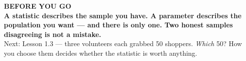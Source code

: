 \documentclass[aspectratio=169, 11pt]{beamer}
\begin{document}
{
\begin{frame}[plain]
  \vspace{1.5cm}\hspace{0.8cm}%
  \begin{minipage}{0.86\textwidth}
    {\color{goldacc}\bfseries\small BEFORE YOU GO}\\[0.7cm]
    {\color{white}\bfseries\Large A statistic describes the sample you have. A parameter
    describes the population you want --- and there is only one. Two honest samples
    disagreeing is not a mistake.}\\[0.9cm]
    {\color{frostmid}\small Next: Lesson 1.3 --- three volunteers each grabbed 50 shoppers.
    \emph{Which} 50? How you choose them decides whether the statistic is worth anything.}
  \end{minipage}
\end{frame}
}
\end{document}
